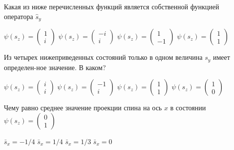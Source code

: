 \documentclass[11pt,a4paper]{exam}
\begin{document}
\begin{questions}
\question Какая из ниже перечисленных функций является собственной функцией оператора ${\hat s_y}$
\begin{choices}
\choice $\psi ({s_z}) = \left( {\begin{array}{*{20}{c}}
1\\
i
\end{array}} \right)$   
\choice $\psi ({s_z}) = \left( {\begin{array}{*{20}{c}}
{ - i}\\
i
\end{array}} \right)$   
\choice $\psi ({s_z}) = \left( {\begin{array}{*{20}{c}}
1\\
{ - 1}
\end{array}} \right)$   
\choice $\psi ({s_z}) = \left( {\begin{array}{*{20}{c}}
1\\
1
\end{array}} \right)$
\end{choices}

\question Из четырех нижеприведенных состояний только в одном величина ${s_y}$ имеет определен-ное значение. В каком?
\begin{choices}
\choice $\psi ({s_z}) = \left( {\begin{array}{*{20}{c}}
i\\
i
\end{array}} \right)$   
\choice $\psi ({s_z}) = \left( {\begin{array}{*{20}{c}}
{ - 1}\\
i
\end{array}} \right)$   
\choice $\psi ({s_z}) = \left( {\begin{array}{*{20}{c}}
1\\
1
\end{array}} \right)$   
\choice $\psi ({s_z}) = \left( {\begin{array}{*{20}{c}}
1\\
0
\end{array}} \right)$
\end{choices}

\question Чему равно среднее значение проекции спина на ось $x$ в состоянии $\psi ({s_z}) = \left( {\begin{array}{*{20}{c}}
0\\
1
\end{array}} \right)$
\begin{choices}
\choice ${\bar s_x} =  - 1/4$      
\choice ${\bar s_x} = 1/4$      
\choice ${\bar s_x} = 1/3$      
\choice ${\bar s_x} = 0$
\end{choices}


\end{questions}
\end{document}
